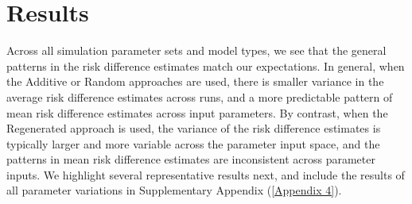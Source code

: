 \documentclass{article}
\theoremstyle{definition}
\begin{document}

\section{Results}

Across all simulation parameter sets and model types, we see that the general patterns in the risk difference estimates match our expectations. In general, when the Additive or Random approaches are used, there is smaller variance in the average risk difference estimates across runs, and a more predictable pattern of mean risk difference estimates across input parameters. By contrast, when the Regenerated approach is used, the variance of the risk difference estimates is typically larger and more variable across the parameter input space, and the patterns in mean risk difference estimates are inconsistent across parameter inputs. We highlight several representative results next, and include the results of all parameter variations in Supplementary Appendix (\ref{Appendix 4}).
\end{document}
